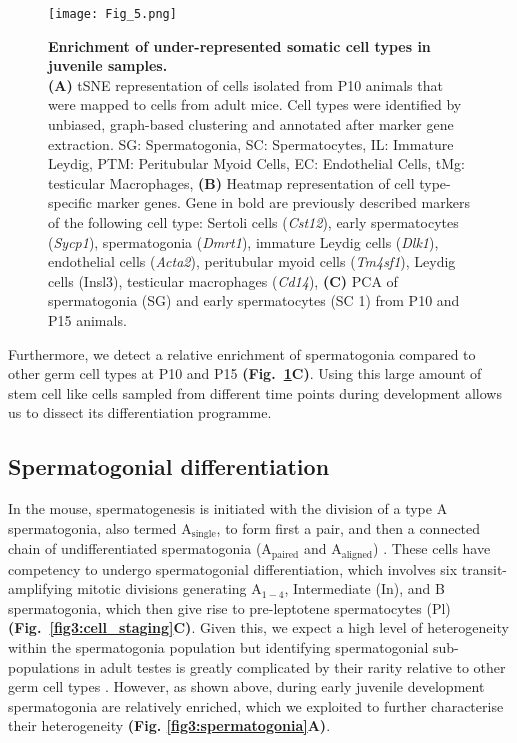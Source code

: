 \begin{figure}[!h]
\centering
\texttt{[image: Fig\_5.png]}
\caption[Enrichment of under-represented somatic cell types in juvenile samples]{\textbf{Enrichment of under-represented somatic cell types in juvenile samples.} \\
\textbf{(A)} tSNE representation of cells isolated from P10 animals that were mapped to cells from adult mice. Cell types were identified by unbiased, graph-based clustering and annotated after marker gene extraction. SG: Spermatogonia, SC: Spermatocytes, IL: Immature Leydig, PTM: Peritubular Myoid Cells, EC: Endothelial Cells, tMg: testicular Macrophages, \textbf{(B)} Heatmap representation of cell type-specific marker genes. Gene in bold are previously described markers of the following cell type: Sertoli cells (\textit{Cst12}), early spermatocytes (\textit{Sycp1}), spermatogonia (\textit{Dmrt1}), immature Leydig cells (\textit{Dlk1}), endothelial cells (\textit{Acta2}), peritubular myoid cells (\textit{Tm4sf1}), Leydig cells (Insl3), testicular macrophages (\textit{Cd14}), \textbf{(C)} PCA of spermatogonia (SG) and early spermatocytes (SC 1) from P10 and P15 animals. 
}
\label{fig3:somatic_cells}
\end{figure}

Furthermore, we detect a relative enrichment of spermatogonia compared to other germ cell types at P10 and P15 \textbf{(Fig.~\ref{fig3:somatic_cells}C)}. Using this large amount of stem cell like cells sampled from different time points during development allows us to dissect its differentiation programme.

\newpage

\subsection{Spermatogonial differentiation}

In the mouse, spermatogenesis is initiated with the division of a type A spermatogonia, also termed A$_{\text{single}}$, to form first a pair, and then a connected chain of undifferentiated spermatogonia (A$_{\text{paired}}$ and A$_{\text{aligned}}$) \citep{Oakberg1971, DeRooij1973}. These cells have competency to undergo spermatogonial differentiation, which involves six transit-amplifying mitotic divisions generating A$_{1-4}$, Intermediate (In), and B spermatogonia, which then give rise to pre-leptotene spermatocytes (Pl) \citep{DeRooij2000} \textbf{(Fig.~\ref{fig3:cell_staging}C)}. Given this, we expect a high level of heterogeneity within the spermatogonia population but identifying spermatogonial sub-populations in adult testes is greatly complicated by their rarity relative to other germ cell types \citep{Lukassen2018}. However, as shown above, during early juvenile development spermatogonia are relatively enriched, which we exploited to further characterise their heterogeneity \textbf{(Fig. \ref{fig3:spermatogonia}A)}. \\

